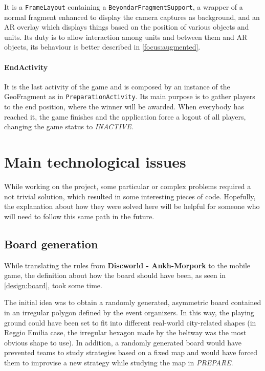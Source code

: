 		It is a \lstinline|FrameLayout| containing a \lstinline|BeyondarFragmentSupport|, a wrapper of a normal fragment enhanced to display the camera captures as background, and an AR overlay which displays things based on the position of various objects and units.
		Its duty is to allow interaction among units and between them and AR objects, its behaviour is better described in \autoref{focus:augmented}.
		
		\paragraph{EndActivity}
	
		It is the last activity of the game and is composed by an instance of the GeoFragment as in \lstinline|PreparationActivity|.
		Its main purpose is to gather players to the end position, where the winner will be awarded. When everybody has reached it, the game finishes and the application force a logout of all players, changing the game status to \emph{INACTIVE}.
	
	\section{Main technological issues}\label{focus:general}
		
		While working on the project, some particular or complex problems required a not trivial solution, which resulted in some interesting pieces of code.
		Hopefully, the explanation about how they were solved here will be helpful for someone who will need to follow this same path in the future.
		
		\subsection{Board generation}\label{focus:board}
		
			While translating the rules from \textbf{Discworld - Ankh-Morpork} to the mobile game, the definition about how the board should have been, as seen in \autoref{design:board}, took some time.
			
			The initial idea was to obtain a randomly generated, asymmetric board contained in an irregular polygon defined by the event organizers.
			In this way, the playing ground could have been set to fit into different real-world city-related shapes (in Reggio Emilia case, the irregular hexagon made by the beltway was the most obvious shape to use).
			In addition, a randomly generated board would have prevented teams to study strategies based on a fixed map and would have forced them to improvise a new strategy while studying the map in \emph{PREPARE}.
			
